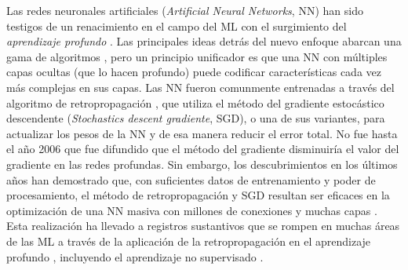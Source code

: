 Las redes neuronales artificiales ({\em Artificial Neural Networks}, NN) han sido testigos de un renacimiento en el campo del ML con el surgimiento del {\em aprendizaje profundo} \cite{Bengio2006, Hinton2006, Le2012, Ranzato2007}. Las principales ideas detrás del nuevo enfoque abarcan una gama de algoritmos \cite{Bengio2007, Hinton2006}, pero un principio unificador es que una NN con múltiples capas ocultas (que lo hacen profundo) puede codificar características cada vez más complejas en sus capas. Las NN fueron comunmente entrenadas a través del algoritmo de retropropagación \cite{Rumelhart1986b}, que utiliza el método del gradiente estocástico descendente ({\em Stochastics descent gradiente}, SGD), o una de sus variantes, para actualizar los pesos de la NN y de esa manera reducir el error total. No fue hasta el año 2006 que fue difundido que el método del gradiente disminuiría el valor del gradiente en las redes profundas. Sin embargo, los descubrimientos en los últimos años han demostrado que, con suficientes datos de entrenamiento y poder de procesamiento, el método de retropropagación y SGD resultan ser eficaces en la optimización de una NN masiva con millones de conexiones y muchas capas \cite{Ciresan2012, He2015, Le2012}. Esta realización ha llevado a registros sustantivos que se rompen en muchas áreas de las ML a través de la aplicación de la retropropagación en el aprendizaje profundo \cite{Ciresan2012, He2015, Le2012}, incluyendo el aprendizaje no supervisado \cite{Bengio2009}.








